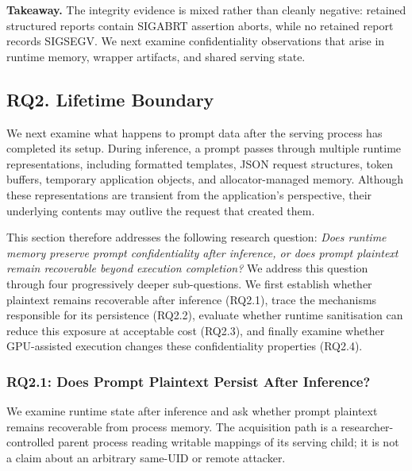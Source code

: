 \documentclass[journal,tifs]{IEEEtran}
\begin{document}
{\bf Takeaway.}
The integrity evidence is mixed rather than cleanly negative: retained
structured reports contain SIGABRT assertion aborts, while no retained
report records SIGSEGV. We next examine confidentiality observations that
arise in runtime memory, wrapper artifacts, and shared serving state.

\subsection{RQ2. Lifetime Boundary}
\label{sec:rq2}

We next examine what happens to prompt data after the serving process has
completed its setup. During inference, a prompt passes through
multiple runtime representations, including formatted templates, JSON
request structures, token buffers, temporary application objects, and
allocator-managed memory. Although these representations are transient
from the application's perspective, their underlying contents may
outlive the request that created them.

This section therefore addresses the following research question: \emph{Does runtime memory preserve prompt confidentiality after
inference, or does prompt plaintext remain recoverable beyond execution
completion?}  We address this question through four progressively deeper
sub-questions. We first establish whether plaintext remains recoverable
after inference (RQ2.1), trace the mechanisms responsible for its
persistence (RQ2.2), evaluate whether runtime sanitisation can reduce
this exposure at acceptable cost (RQ2.3), and finally examine whether
GPU-assisted execution changes these confidentiality properties (RQ2.4).

\subsubsection{RQ2.1: Does Prompt Plaintext Persist After Inference?}
\label{sec:rq2_plaintext}

We examine runtime state after inference and ask whether prompt plaintext
remains recoverable from process memory. The acquisition path is a
researcher-controlled parent process reading writable mappings of its
serving child; it is not a claim about an arbitrary same-UID or remote
attacker.
\end{document}
